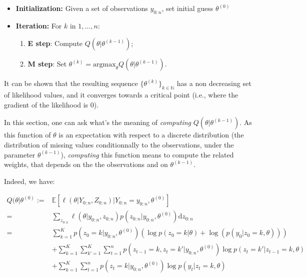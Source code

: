 \documentclass[]{book}
\providecommand{\tightlist}{%
  \setlength{\itemsep}{0pt}\setlength{\parskip}{0pt}}
\begin{document}
\begin{itemize}
\tightlist
\item
  \textbf{Initialization:} Given a set of observations \(y_{0:n}\), set initial guess \(\theta^{(0)}\)
\item
  \textbf{Iteration:} For \(k\) in \(1,\dots, n\):

  \begin{enumerate}
  \def\labelenumi{\arabic{enumi}.}
  \tightlist
  \item
    \textbf{E step}: Compute \(Q(\theta \vert \theta^{(k-1)})\);
  \item
    \textbf{M step}: Set \(\theta^{(k)} = \text{argmax}_\theta Q(\theta \vert \theta^{(k-1)})\).
  \end{enumerate}
\end{itemize}

It can be shown that the resulting sequence \(\lbrace\theta^{(k)} \rbrace_{k \in \mathbb{N}}\) has a non decreasing set of likelihood values, and it converges towards a critical point (i.e., where the gradient of the likelihood is 0).

In this section, one can ask what's the meaning of \emph{computing} \(Q(\theta \vert \theta^{(k-1)})\).
As this function of \(\theta\) is an expectation with respect to a discrete distribution (the distribution of missing values conditionnally to the observations, under the parameter \(\theta^{(k-1)}\)), \emph{computing} this function means to compute the related weights, that depends on the the observations and on \(\theta^{(k-1)}\).

Indeed, we have:

\begin{align}
Q(\theta \vert \theta^{(0)} :=& \mathbb{E}[\ell(\theta \vert Y_{0:n}, Z_{0:n}) \vert Y_{0:n} = y_{0:n}, \theta^{(0)}]\nonumber \\
=& \sum_{z_{0:n}} \ell(\theta \vert y_{0:n}, z_{0:n}) p(z_{0:n} \vert y_{0:n}, \theta^{(0)}) \text{d} z_{0:n} \nonumber \\
=& \sum_{k = 1}^K p(z_0 = k \vert y_{0:n}, \theta^{(0)})\left(\log p(z_0 = k \vert \theta) + \log(p(y_0 \vert z_0 = k, \theta))\right)  \nonumber \\
& + \sum_{k = 1}^K\sum_{k' = 1}^K \sum_{t = 1}^n p(z_{t-1} = k, z_{t} = k'\vert y_{0:n}, \theta^{(0)}) \log p(z_{t} = k' \vert z_{t - 1} = k,\theta) \nonumber \\
& + \sum_{k = 1}^K \sum_{t = 1}^n p(z_t = k\vert y_{0:n}, \theta^{(0)}) \log p(y_{t} \vert z_{t} = k, \theta) \nonumber
\end{align}
\end{document}
